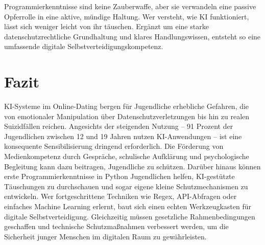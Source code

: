 \documentclass[12pt,a4paper,oneside]{scrartcl}
\begin{document}
	Programmierkenntnisse sind keine Zauberwaffe, aber sie verwandeln eine passive Opferrolle in eine aktive, mündige Haltung. Wer versteht, wie KI funktioniert, lässt sich weniger leicht von ihr täuschen. Ergänzt um eine starke datenschutzrechtliche Grundhaltung und klares Handlungswissen, entsteht so eine umfassende digitale Selbstverteidigungskompetenz.
	
	\section{Fazit}
	
	KI-Systeme im Online-Dating bergen für Jugendliche erhebliche Gefahren, die von emotionaler Manipulation über Datenschutzverletzungen bis hin zu realen Suizidfällen reichen. Angesichts der steigenden Nutzung – 91 Prozent der Jugendlichen zwischen 12 und 19 Jahren nutzen KI-Anwendungen \cite{JIM2025} – ist eine konsequente Sensibilisierung dringend erforderlich. Die Förderung von Medienkompetenz durch Gespräche, schulische Aufklärung und psychologische Begleitung kann dazu beitragen, Jugendliche zu schützen. Darüber hinaus können erste Programmierkenntnisse in Python Jugendlichen helfen, KI-gestützte Täuschungen zu durchschauen und sogar eigene kleine Schutzmechanismen zu entwickeln. Wer fortgeschrittene Techniken wie Regex, API-Abfragen oder einfaches Machine Learning erlernt, baut sich einen echten Werkzeugkasten für digitale Selbstverteidigung. Gleichzeitig müssen gesetzliche Rahmenbedingungen geschaffen und technische Schutzmaßnahmen verbessert werden, um die Sicherheit junger Menschen im digitalen Raum zu gewährleisten.
	
\end{document}
